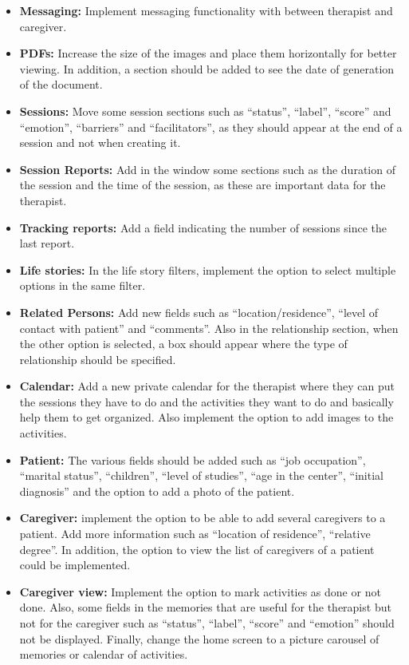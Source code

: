 \begin{itemize}
\item \textbf{Messaging:} Implement messaging functionality with between therapist and caregiver.
\item \textbf{PDFs:} Increase the size of the images and place them horizontally for better viewing. In addition, a section should be added to see the date of generation of the document.
\item \textbf{Sessions:} Move some session sections such as ``status'', ``label'', ``score'' and ``emotion'', ``barriers'' and ``facilitators'', as they should appear at the end of a session and not when creating it.
\item \textbf{Session Reports:} Add in the window some sections such as the duration of the session and the time of the session, as these are important data for the therapist.
\item \textbf{Tracking reports:} Add a field indicating the number of sessions since the last report.
\item \textbf{Life stories:} In the life story filters, implement the option to select multiple options in the same filter.
\item \textbf{Related Persons:} Add new fields such as ``location/residence'', ``level of contact with patient'' and ``comments''. Also in the relationship section, when the other option is selected, a box should appear where the type of relationship should be specified.
\item \textbf{Calendar:} Add a new private calendar for the therapist where they can put the sessions they have to do and the activities they want to do and basically help them to get organized. Also implement the option to add images to the activities.
\item \textbf{Patient:} The various fields should be added such as ``job occupation'', ``marital status'', ``children'', ``level of studies'', ``age in the center'', ``initial diagnosis'' and the option to add a photo of the patient.
\item \textbf{Caregiver:} implement the option to be able to add several caregivers to a patient. Add more information such as ``location of residence'', ``relative degree''. In addition, the option to view the list of caregivers of a patient could be implemented.
\item \textbf{Caregiver view:} Implement the option to mark activities as done or not done. Also, some fields in the memories that are useful for the therapist but not for the caregiver such as ``status'', ``label'', ``score'' and ``emotion'' should not be displayed. Finally, change the home screen to a picture carousel of memories or calendar of activities.

\end{itemize}
